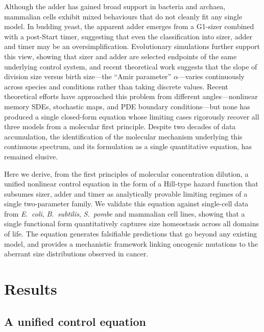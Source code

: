 \documentclass[11pt]{article}
\newcommand{\Ecoli}{\textit{E.~coli}}
\newcommand{\Spombe}{\textit{S.~pombe}}
\newcommand{\Bsubtilis}{\textit{B.~subtilis}}
\begin{document}
Although the adder has gained broad support in bacteria and
archaea\cite{taheri2015,eun2018}, mammalian cells exhibit mixed
behaviours that do not cleanly fit any single
model\cite{cadart2018}.  In budding yeast, the apparent adder
emerges from a G1-sizer combined with a post-Start
timer\cite{chandler2017}, suggesting that even the classification
into sizer, adder and timer may be an oversimplification.
Evolutionary simulations further support this view, showing that
sizer and adder are selected endpoints of the same underlying
control system\cite{proulx2022}, and recent theoretical work
suggests that the slope of division size versus birth size---the
``Amir parameter'' $\alpha$\cite{amir2014}---varies continuously
across species and conditions rather than taking discrete values.
Recent theoretical efforts have approached this problem from
different angles---nonlinear memory
SDEs\cite{zhang2025nonlinear}, stochastic
maps\cite{genthon2026extrinsic}, and PDE boundary
conditions\cite{fan2025quantitative}---but none has produced a
single closed-form equation whose limiting cases rigorously recover
all three models from a molecular first principle.
Despite two decades of data accumulation, the identification of
the molecular mechanism underlying this continuous spectrum, and its
formulation as a single quantitative equation, has remained elusive.

Here we derive, from the first principles of molecular concentration
dilution, a unified nonlinear control equation in the form of a
Hill-type hazard function that subsumes sizer, adder and timer as
analytically provable limiting regimes of a single two-parameter
family.  We validate this equation against single-cell data from
\Ecoli{}, \Bsubtilis{}, \Spombe{} and mammalian cell lines, showing
that a single functional form quantitatively captures size homeostasis
across all domains of life.  The equation generates falsifiable
predictions that go beyond any existing model, and provides a
mechanistic framework linking oncogenic mutations to the aberrant size
distributions observed in cancer.

\section*{Results}

\subsection*{A unified control equation}
\end{document}
